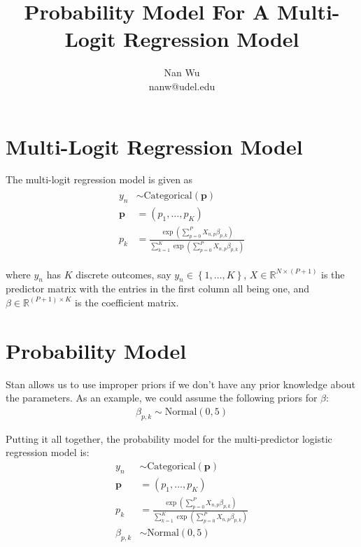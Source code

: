\documentclass[12pt]{article}
\begin{document}
\title{Probability Model For A Multi-Logit Regression Model}
\author{Nan Wu \\ nanw@udel.edu}
\date{}
\maketitle

\section{Multi-Logit Regression Model}

The multi-logit regression model is given as
\begin{align}
\begin{split}
  y_n &\sim \mathrm{Categorical} \left(\mathbf{p}\right) \\
  \mathbf{p} &=\left(p_1,\ldots,p_K \right)\\
  p_k &= \frac{\exp\left( \sum\limits_{p=0}^P X_{n,p}\beta_{p,k} \right)}{\sum \limits_{k=1}^K \exp \left( \sum\limits_{p=0}^P X_{n,p}\beta_{p,k} \right)}
\end{split}
\end{align}

where $y_n$ has $K$ discrete outcomes, say $y_n \in \left\{1,\ldots,K\right\}$, $X\in \mathbb{R}^{N \times (P+1)}$ is the predictor matrix with the entries in the first column all being one, and $\beta \in \mathbb{R}^{(P+1) \times K}$ is the coefficient matrix.

\section{Probability Model}

Stan allows us to use improper priors if we don't have any prior knowledge about the parameters. As an example, we could assume the following priors for $\beta$:
\begin{align*}
\beta_{p,k} \sim \mathrm{Normal}\left( 0,5 \right)
\end{align*}

Putting it all together, the probability model for the multi-predictor logistic regression model is:
\begin{align*}
  y_n &\sim \mathrm{Categorical} \left(\mathbf{p}\right) \\
  \mathbf{p} &=\left(p_1,\ldots,p_K \right) \\
  p_k &= \frac{\exp\left( \sum\limits_{p=0}^P X_{n,p}\beta_{p,k} \right)}{\sum \limits_{k=1}^K \exp \left( \sum\limits_{p=0}^P X_{n,p}\beta_{p,k} \right)} \\
  \beta_{p,k} &\sim \mathrm{Normal}\left( 0,5 \right)
\end{align*}
\end{document}
